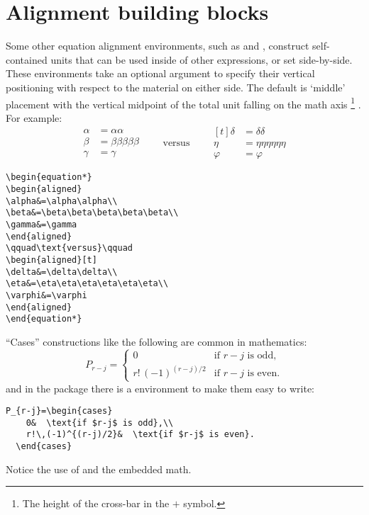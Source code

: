 \documentclass[leqno,titlepage,openany]{amsldoc}
\begin{document}
\section{Alignment building blocks}

Some other equation alignment environments, such as  and
, construct self-contained units that
can be used inside of other expressions, or set side-by-side. These
environments take an optional argument to specify their vertical
positioning with respect to the material on either side. The default is
`middle' placement with the vertical midpoint of the total unit
falling on the math axis%
\footnote{The height of the cross-bar in the $+$ symbol.}%
. For example:
\begin{equation*}
\begin{aligned}
\alpha&=\alpha\alpha\\
\beta&=\beta\beta\beta\beta\beta\\
\gamma&=\gamma
\end{aligned}
\qquad\text{versus}\qquad
\begin{aligned}[t]
\delta&=\delta\delta\\
\eta&=\eta\eta\eta\eta\eta\eta\\
\varphi&=\varphi
\end{aligned}
\end{equation*}
%
\pagebreak

\begin{verbatim}
\begin{equation*}
\begin{aligned}
\alpha&=\alpha\alpha\\
\beta&=\beta\beta\beta\beta\beta\\
\gamma&=\gamma
\end{aligned}
\qquad\text{versus}\qquad
\begin{aligned}[t]
\delta&=\delta\delta\\
\eta&=\eta\eta\eta\eta\eta\eta\\
\varphi&=\varphi
\end{aligned}
\end{equation*}
\end{verbatim}

``Cases'' constructions like the following are common in
mathematics:
\begin{equation}\label{eq:C}
P_{r-j}=
  \begin{cases}
    0&  \text{if $r-j$ is odd},\\
    r!\,(-1)^{(r-j)/2}&  \text{if $r-j$ is even}.
  \end{cases}
\end{equation}
and in the  package there is a  environment to
make them easy to write:
\begin{verbatim}
P_{r-j}=\begin{cases}
    0&  \text{if $r-j$ is odd},\\
    r!\,(-1)^{(r-j)/2}&  \text{if $r-j$ is even}.
  \end{cases}
\end{verbatim}
Notice the use of  and the embedded math.
\end{document}
